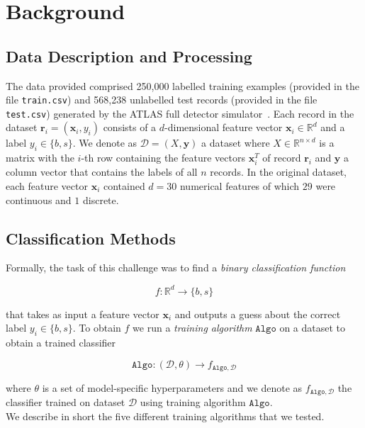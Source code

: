 \documentclass[10pt,conference,compsocconf]{IEEEtran}
\newcommand{\Data}{\mathcal{D}}
\newcommand{\features}{\mathbf{x}_i}
\newcommand{\target}{y_i}
\newcommand{\targetset}{\{ b, s \}}
\newcommand{\targetvector}{\mathbf{y}}
\newcommand{\classifier}[2]{f_{#1, #2}}
\newcommand{\Train}{\mathtt{Algo}}
\begin{document}
\section{Background}

\subsection{Data Description and Processing}
\label{sec:data}
The data provided comprised 250,000 labelled training examples (provided in the file \texttt{train.csv}) and 568,238 unlabelled test records (provided in the file \texttt{test.csv}) generated by the ATLAS full detector simulator~\cite{HiggsML}.
Each record in the dataset $\mathbf{r}_i = (\features, \target)$ consists of a $d$-dimensional feature vector $\features \in \mathbb{R}^d$ and a label $\target \in \targetset$. We denote as $\Data = (X, \targetvector)$ a dataset where $X \in \mathbb{R}^{n \times d}$ is a matrix with the $i$-th row containing the feature vectors $\features^T$ of record $\mathbf{r}_i$ and $\targetvector$ a column vector that contains the labels of all $n$ records.       
In the original dataset, each feature vector $\features$ contained $d=30$ numerical features of which $29$ were continuous and $1$ discrete.

\subsection{Classification Methods}
Formally, the task of this challenge was to find a \emph{binary classification function}

\begin{equation}
	f: \mathbb{R}^d \rightarrow \targetset
\end{equation}

that takes as input a feature vector $\features$ and outputs a guess about the correct label $\target \in \targetset$. To obtain $f$ we run a \emph{training algorithm} $\Train$ on a dataset to obtain a trained classifier

\begin{equation}
	\Train: (\Data, \theta) \rightarrow \classifier{\Train}{\Data}
\end{equation}

where $\theta$ is a set of model-specific hyperparameters and we denote as $\classifier{\Train}{\Data}$ the classifier trained on dataset $\Data$ using training algorithm $\Train$.\\

We describe in short the five different training algorithms that we tested.
\end{document}
